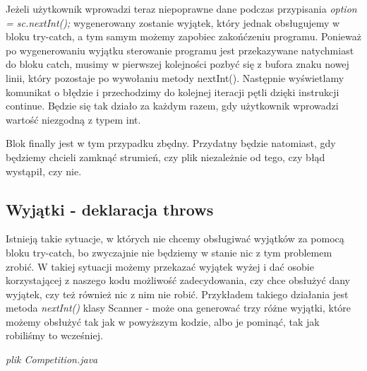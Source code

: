 \documentclass[letterpaper,10pt,english]{sphinxmanual}
\begin{document}
Jeżeli użytkownik wprowadzi teraz niepoprawne dane podczas przypisania \emph{option = sc.nextInt();} wygenerowany zostanie wyjątek, który jednak obsługujemy w bloku try-catch, a tym samym możemy zapobiec zakońćzeniu programu. Ponieważ po wygenerowaniu wyjątku sterowanie programu jest przekazywane natychmiast do bloku catch, musimy w pierwszej kolejności pozbyć się z bufora znaku nowej linii, który pozostaje po wywołaniu metody nextInt(). Następnie wyświetlamy komunikat o błędzie i przechodzimy do kolejnej iteracji pętli dzięki instrukcji continue. Będzie się tak działo za każdym razem, gdy użytkownik wprowadzi wartość niezgodną z typem int.

Blok finally jest w tym przypadku zbędny. Przydatny będzie natomiast, gdy będziemy chcieli zamknąć strumień, czy plik niezależnie od tego, czy błąd wystąpił, czy nie.


\subsection{Wyjątki - deklaracja throws}
\label{wyjkol:wyjatki-deklaracja-throws}
Istnieją takie sytuacje, w których nie chcemy obsługiwać wyjątków za pomocą bloku try-catch, bo zwyczajnie nie będziemy w stanie nic z tym problemem zrobić. W takiej sytuacji możemy przekazać wyjątek wyżej i dać osobie korzystającej z naszego kodu możliwość zadecydowania, czy chce obsłużyć dany wyjątek, czy też również nic z nim nie robić. Przykładem takiego działania jest metoda \emph{nextInt()} klasy Scanner - może ona generować trzy różne wyjątki, które możemy obsłużyć tak jak w powyższym kodzie, albo je pominąć, tak jak robiliśmy to wcześniej.

\emph{plik Competition.java}
\end{document}

